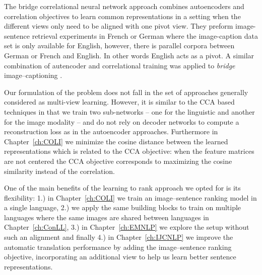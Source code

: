 The bridge correlational neural network approach \citep{rajendran2015bridge}
combines autoencoders and correlation objectives to
learn common representations in a setting when the different views only need to be
aligned with one pivot view. They preform
image-sentence retrieval experiments in French or German where
the image-caption data set is only available for English, however,
there is parallel corpora between German or French and English. In other words English acts as a pivot.
A similar combination of autencoder and correlational training was applied to \emph{bridge}
image--captioning \citep{Saha2016}.

Our formulation of the problem does not fall in the set of approaches generally
considered as multi-view learning.  However, it is similar to the CCA based techniques in that we
train two sub-networks -- one for the linguistic and another for the image modality --
and do not rely on decoder networks to compute a reconstruction  loss as in the autoencoder approaches.
Furthermore in Chapter~\ref{ch:COLI} we minimize the cosine distance between the learned representations
which is related to the CCA objective: when the feature matrices are not centered
the CCA objective corresponds to maximizing the cosine similarity instead of the correlation.

One of the main benefits of the learning to rank approach we opted for is
its flexibility: 1.) in Chapter~\ref{ch:COLI} we train an image--sentence ranking model in a single
language, 2.) we apply the same building blocks to train on multiple languages where
the same images are shared between languages in Chapter~\ref{ch:ConLL}, 3.) in
Chapter~\ref{ch:EMNLP} we explore the setup without such an alignment and finally 4.)
in Chapter~\ref{ch:IJCNLP} we improve the automatic translation  performance
by adding the image--sentence ranking objective, incorporating an additional view
to help us learn better sentence representations.

